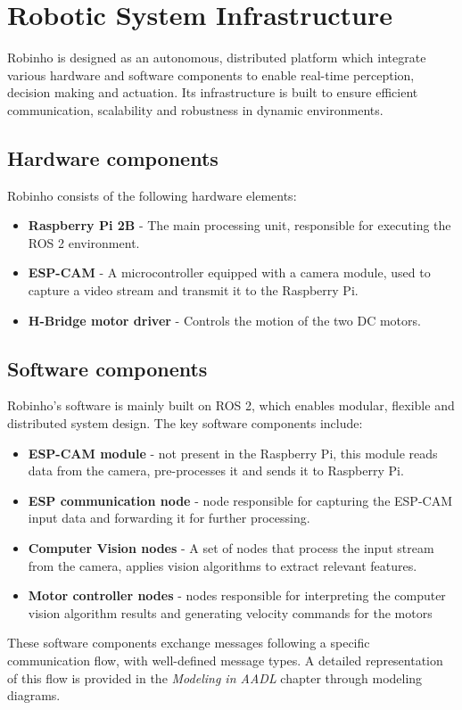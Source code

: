 \chapter{Robotic System Infrastructure}
Robinho is designed as an autonomous, distributed platform which integrate various hardware and software components to enable real-time perception, decision making and actuation. Its infrastructure is built to ensure efficient communication, scalability and robustness in dynamic environments.
\section{Hardware components}
Robinho consists of the following hardware elements: 
\begin{itemize}
    \item \textbf{Raspberry Pi 2B} - The main processing unit, responsible for executing the ROS 2 environment.
    \item \textbf{ESP-CAM} - A microcontroller equipped with a camera module, used to capture a video stream and transmit it to the Raspberry Pi.
    \item \textbf{H-Bridge motor driver} - Controls the motion of the two DC motors.
\end{itemize}

\section{Software components}
Robinho's software is mainly built on ROS 2, which enables modular, flexible and distributed system design. The key software components include:
\begin{itemize}
    \item \textbf{ESP-CAM module} - not present in the Raspberry Pi, this module reads data from the camera, pre-processes it and sends it to Raspberry Pi.
    \item \textbf{ESP communication node} - node responsible for capturing the ESP-CAM input data and forwarding it for further processing.
    \item \textbf{Computer Vision nodes} - A set of nodes that process the input stream from the camera, applies vision algorithms to extract relevant features.
    \item \textbf{Motor controller nodes} - nodes responsible for interpreting the computer vision algorithm results and generating velocity commands for the motors
\end{itemize}
These software components exchange messages following a specific communication flow, with well-defined message types. A detailed representation of this flow is provided in the \textit{Modeling in AADL} chapter through modeling diagrams.
